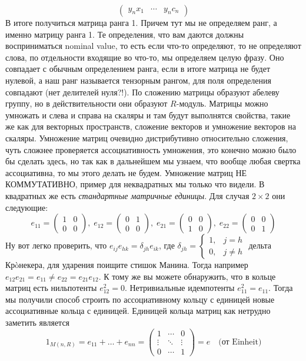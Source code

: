 \begin{itemize}
\[\begin{pmatrix}
              y_nx_1 & \cdots & y_nc_n
          \end{pmatrix}\]
        В итоге получиться матрица ранга 1. Причем тут мы не определяем ранг, а
        именно матрицу ранга 1. Те определения, что вам даются должны
        восприниматься nominal value, то есть если что-то определяют, то не
        определяют слова, по отдельности входящие во что-то, мы определяем
        целую фразу. Оно совпадает с обычным определением ранга, если в итоге
        матрица не будет нулевой, а наш ранг называется тензорным рангом, для
        поля определения совпадают (нет делителей нуля?!). По сложению матрицы
        образуют абелеву группу, но в действительности они образуют $R$-модуль.
        Матрицы можно умножать и слева и справа на скаляры и там будут
        выполнятся свойства, такие же как для векторных пространств, сложение
        векторов и умножение векторов на скаляры. Умножение матриц очевидно
        дистрибутивно относительно сложения, чуть сложнее проверяется
        ассоциативность умножения, это конечно можно было бы сделать здесь, но
        так как в дальнейшем мы узнаем, что вообще любая свертка ассоциативна,
        то мы этого делать не будем. Умножение матриц НЕ КОММУТАТИВНО, пример
        для неквадратных мы только что видели. В квадратных же есть \emph{
        стандартные матричные единицы}. Для случая $2\times2$ они следующие:
        \[e_{11}=\begin{pmatrix}1&0\\0&0\end{pmatrix},\;
          e_{12}=\begin{pmatrix}0&1\\0&0\end{pmatrix},\;
          e_{21}=\begin{pmatrix}0&0\\1&0\end{pmatrix},\;
          e_{22}=\begin{pmatrix}0&0\\0&1\end{pmatrix}
        \]
        Ну вот легко проверить, что $e_{ij}e_{hk}=\delta_{jh}e_{ik}$, где
        $\delta_{jh}=\begin{cases}1, & j=h\\ 0, & j\neq h\end{cases}$ дельта
        Крòнекера, для ударения поищите стишок Манина. Тогда например $e_{12}
        e_{21}=e_{11}\neq e_{22}=e_{21}e_{12}$. К тому же вы можете обнаружить,
        что в кольце матриц есть нильпотенты $e_{12}^2=0$. Нетривиальные
        идемпотенты $e_{11}^2=e_{11}$. Тогда мы получили способ строить по
        ассоциативному кольцу с единицей новые ассоциативные кольца с единицей.
        Единицей кольца матриц как нетрудно заметить является
        \[1_{M(n,R)}=e_{11}+\ldots+e_{nn}=\begin{pmatrix}1&\cdots&0\\\vdots&
        \ddots&\vdots\\0&\cdots&1\end{pmatrix}=e\quad\text{(от Einheit)}\]
        

\end{itemize}

